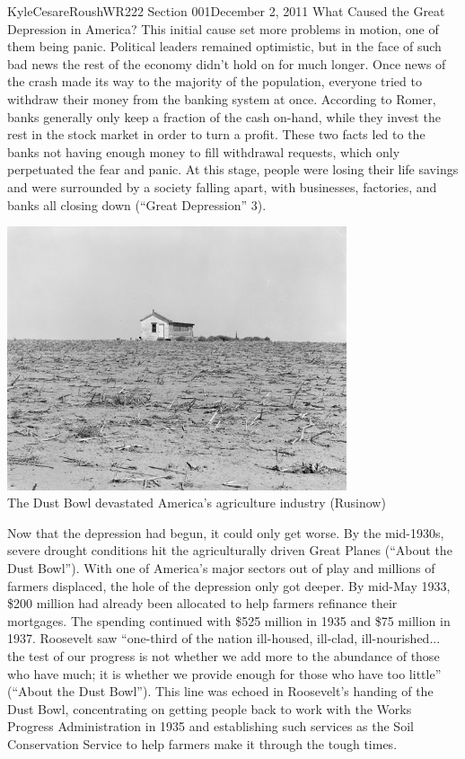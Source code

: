 \documentclass[12pt,letterpaper]{article}
\begin{document}
\begin{mla}{Kyle}{Cesare}{Roush}{WR222 Section 001}{December 2, 2011}{
What Caused the Great Depression in America?}
This initial cause set more problems in motion, one of them being panic.
Political leaders remained optimistic, but in the face of such bad news the rest
of the economy didn't hold on for much longer.  Once news of the crash made its
way to the majority of the population, everyone tried to withdraw their money
from the banking system at once.  According to Romer, banks generally only keep
a fraction of the cash on-hand, while they invest the rest in the stock market
in order to turn a profit.  These two facts led to the banks not having enough
money to fill withdrawal requests, which only perpetuated the fear and panic.
At this stage, people were losing their life savings and were surrounded by a
society falling apart, with businesses, factories, and banks all closing down
(``Great Depression'' 3).

\begin{center}
\includegraphics[width=10cm]{essay_3_dustbowl} \\
The Dust Bowl devastated America's agriculture industry (Rusinow)
\end{center}

Now that the depression had begun, it could only get worse.  By the mid-1930s,
severe drought conditions hit the agriculturally driven Great Planes (``About
the Dust Bowl'').  With one of America's major sectors out of play and millions
of farmers displaced, the hole of the depression only got deeper.  By mid-May
1933, \$200 million had already been allocated to help farmers refinance their
mortgages.  The spending continued with \$525 million in 1935 and \$75 million
in 1937.  Roosevelt saw ``one-third of the nation ill-housed, ill-clad,
ill-nourished... the test of our progress is not whether we add more to the
abundance of those who have much; it is whether we provide enough for those who
have too little'' (``About the Dust Bowl'').  This line was echoed in
Roosevelt's handing of the Dust Bowl, concentrating on getting people back to
work with the Works Progress Administration in 1935 and establishing such
services as the Soil Conservation Service to help farmers make it through the
tough times.


\end{mla}
\end{document}
